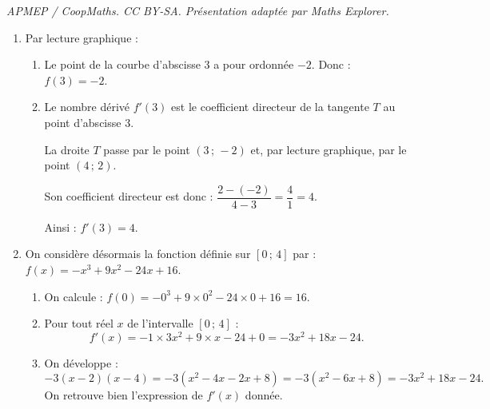 \documentclass[10pt]{article}
\begin{document}
\noindent\textit{APMEP / CoopMaths. CC BY-SA. Présentation adaptée par Maths Explorer.}\par\medskip
\begin{enumerate}
\item Par lecture graphique :
\begin{enumerate}
\item Le point de la courbe d'abscisse 3 a pour ordonnée $-2$. Donc : $f(3)=-2$.

\item Le nombre dérivé $f'(3)$ est le coefficient directeur de la tangente $T$ au point d'abscisse 3.

La droite $T$ passe par le point $(3\,;\,-2)$ et, par lecture graphique, par le point $(4\,;\,2)$. 

Son coefficient directeur est donc : $\dfrac{2-(-2)}{4-3}=\dfrac{4}{1}=4$.

Ainsi : $f'(3)=4$.

\end{enumerate}

\item On considère désormais la fonction définie sur $[0\,;\,4]$ par : $f(x)=-x^3+9x^2-24x+16$.

\begin{enumerate}
\item On calcule : $f(0)=-0^3+9\times 0^2-24\times 0+16=16$.

\item Pour tout réel $x$ de l'intervalle $[0\,;\,4]$ :
\[f'(x)=-1\times3x^2+9\times x-24+0=-3x^2+18x-24.\]

\item On développe :
\[-3(x-2)(x-4)=-3(x^2-4x-2x+8)=-3(x^2-6x+8)=-3x^2+18x-24.\]
On retrouve bien l'expression de $f'(x)$ donnée.
\end{enumerate}
\end{enumerate}
\end{document}
